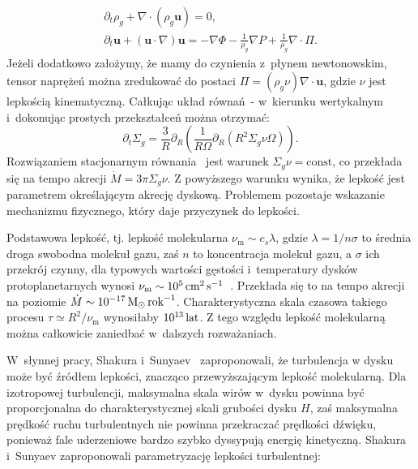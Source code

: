 \begin{gather}
   \partial_t \rho_g + \nabla\cdot\left(\rho_g\mathbf{u}\right) = 0,
   \label{eq:ns1}\\
\partial_t \mathbf{u} + \left(\mathbf{u}\cdot\nabla\right)\mathbf{u} = 
-\nabla\Phi -\frac{1}{\rho_g} \nabla P + \frac{1}{\rho_g} \nabla \cdot \Pi.
\label{eq:ns2}
\end{gather}
%
Jeżeli dodatkowo założymy, że mamy do czynienia z~płynem newtonowskim, tensor
naprężeń można zredukować do postaci $\Pi = (\rho_g \nu)\nabla\cdot\mathbf{u}$,
gdzie $\nu$ jest lepkością kinematyczną. Całkując układ
równań~- w~kierunku wertykalnym i~dokonując prostych
przekształceń można otrzymać:
\begin{equation}\label{eq:sigma}
   \partial_t \Sigma_g =
   \frac{3}{R}\partial_R\left(\frac{1}{R\Omega}\partial_R\left(R^2\Sigma_g \nu
         \Omega\right)\right).
\end{equation}
Rozwiązaniem stacjonarnym równania~ jest warunek $\Sigma_g\nu =
\textrm{const}$, co przekłada się na tempo akrecji $\dot{M} = 3\pi\Sigma_g\nu$.
Z powyższego warunku wynika, że lepkość jest parametrem określającym akrecję
dyskową. Problemem pozostaje wskazanie mechanizmu fizycznego, który daje
przyczynek do lepkości.
\par Podstawowa lepkość, tj. lepkość molekularna $\nu_{\textrm{m}} \sim c_s
\lambda$, gdzie $\lambda = 1 / n\sigma$ to średnia droga swobodna molekuł gazu,
zaś $n$ to koncentracja molekuł gazu, a $\sigma$ ich przekrój czynny, dla
typowych wartości gęstości i~temperatury dysków protoplanetarnych wynosi
$\nu_{\textrm{m}}\sim10^5\hbox{$\thinspace\textrm{cm}$}^2\hbox{$\thinspace\textrm{s}$}^{-1}$~\cite{armitage}. Przekłada się to na
tempo akrecji na poziomie $\dot{M}\sim 10^{-17}\hbox{$\mathrm{\thinspace M_{\odot}}$}\hbox{$\thinspace\textrm{rok}$}^{-1}$. 
Charakterystyczna skala czasowa takiego procesu $\tau \simeq R^2 /
\nu_{\textrm{m}}$ wynosiłaby $10^{13}\hbox{$\thinspace\textrm{lat}$}$. Z tego względu lepkość molekularną można
całkowicie zaniedbać w~dalszych rozważaniach.
\par W~słynnej pracy, Shakura i~Sunyaev~\citep{SS73} zaproponowali, że turbulencja
w dysku może być źródłem lepkości, znacząco przewyższającym
lepkość molekularną. Dla izotropowej turbulencji, maksymalna skala wirów w~dysku
powinna być proporcjonalna do charakterystycznej skali grubości dysku $H$, zaś
maksymalna prędkość ruchu turbulentnych nie powinna przekraczać prędkości
dźwięku, ponieważ fale uderzeniowe bardzo szybko dyssypują energię kinetyczną.
Shakura i~Sunyaev zaproponowali parametryzację lepkości turbulentnej:

